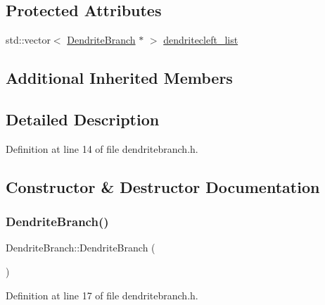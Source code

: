 \subsection*{Protected Attributes}
\begin{DoxyCompactItemize}
\item 
std\+::vector$<$ \mbox{\hyperlink{class_dendrite_branch}{Dendrite\+Branch}} $\ast$ $>$ \mbox{\hyperlink{class_dendrite_branch_a8015119958f7581d826dcac2c21919c9}{dendritecleft\+\_\+list}}
\end{DoxyCompactItemize}
\subsection*{Additional Inherited Members}


\subsection{Detailed Description}


Definition at line 14 of file dendritebranch.\+h.



\subsection{Constructor \& Destructor Documentation}
\mbox{\label{class_dendrite_branch_af391f5fd2379539523b3d2523c59ea8b}} 
\subsubsection{\texorpdfstring{Dendrite\+Branch()}{DendriteBranch()}\hspace{0.1cm}{\footnotesize\ttfamily [1/4]}}
{\footnotesize\ttfamily Dendrite\+Branch\+::\+Dendrite\+Branch (\begin{DoxyParamCaption}{ }\end{DoxyParamCaption})\hspace{0.3cm}{\ttfamily [inline]}}



Definition at line 17 of file dendritebranch.\+h.

\mbox{\label{class_dendrite_branch_a391ba1440a6c29a0752b03eb60357370}} 
